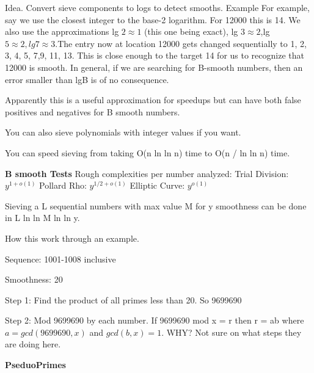 \documentclass{article}
\begin{document}
Idea. Convert sieve components to logs to detect smooths. 
Example 
For example, say we use the closest integer to the base-2 logarithm. For 12000 this is 14. We also use the approximations lg $2\approx 1$ (this one being exact), lg $3\approx 2$,lg $5\approx 2,lg 7 \approx 3$.The entry now at location 12000 gets changed sequentially to 1, 2, 3, 4, 5, 7,9, 11, 13. This is close enough to the target 14 for us to recognize that 12000 is smooth. In general, if we are searching for B-smooth numbers, then an error smaller than lgB is of no consequence.
 
Apparently this is a useful approximation for speedups but can have both false positives and negatives for B smooth numbers.

You can also sieve polynomials with integer values if you want.

You can speed sieving from taking O(n ln ln n) time to O(n / ln ln n) time. 

\textbf{B smooth Tests}
Rough complexities per number analyzed: 
Trial Division: $y^{1 + o(1)}$
Pollard Rho: $y^{1/2 + o(1)}$
Elliptic Curve: $y^{o(1)}$

Sieving a L sequential numbers with max value M for y smoothness can be done in L ln ln M ln ln y. 

How this work through an example.

Sequence: 1001-1008 inclusive

Smoothness: 20


Step 1: Find the product of all primes less than 20. So 9699690

Step 2: Mod 9699690 by each number. 
If 9699690 mod x = r then r = ab where $a = gcd(9699690, x)$ and $gcd(b,x) = 1$. WHY?
Not sure on what steps they are doing here.

\textbf{PseduoPrimes}




\end{document}
